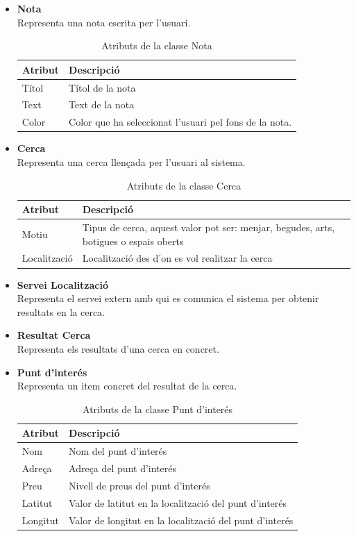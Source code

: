 \begin{itemize}
\item[]\textbf{Nota}\\
Representa una nota escrita per l'usuari.

\begin{table}[!h]
\begin{tabular}{|M|T|}
\hline
\textbf{Atribut}  & \textbf{Descripció} \\\hline
Títol & Títol de la nota\\\hline
Text &  Text de la nota\\\hline
Color & Color que ha seleccionat l'usuari pel fons de la nota.\\\hline
\end{tabular}
\label{}
\caption{Atributs de la classe Nota}
\end{table}

\item[]\textbf{Cerca}\\
Representa una cerca llençada per l'usuari al sistema.

\begin{table}[!h]
\begin{tabular}{|M|T|}
\hline
\textbf{Atribut}  & \textbf{Descripció} \\\hline
Motiu & Tipus de cerca, aquest valor pot ser: menjar, begudes, arts, botigues o espais oberts\\\hline
Localització &  Localització des d'on es vol realitzar la cerca\\\hline
\end{tabular}
\label{}
\caption{Atributs de la classe Cerca}
\end{table}


\item[]\textbf{Servei Localització}\\
Representa el servei extern amb qui es comunica el sistema per obtenir resultats en la cerca.


\item[]\textbf{Resultat Cerca}\\
Representa els resultats d'una cerca en concret.

\item[]\textbf{Punt d'interés}\\
Representa un item concret del resultat de la cerca.

\begin{table}[!h]
\begin{tabular}{|M|T|}
\hline
\textbf{Atribut}  & \textbf{Descripció} \\\hline
Nom & Nom del punt d'interés\\\hline
Adreça &  Adreça del punt d'interés\\\hline
Preu & Nivell de preus del punt d'interés\\\hline
Latitut & Valor de latitut en la localització del punt d'interés\\\hline
Longitut & Valor de longitut en la localització del punt d'interés\\\hline
\end{tabular}
\label{}
\caption{Atributs de la classe Punt d'interés}
\end{table}



\end{itemize}
